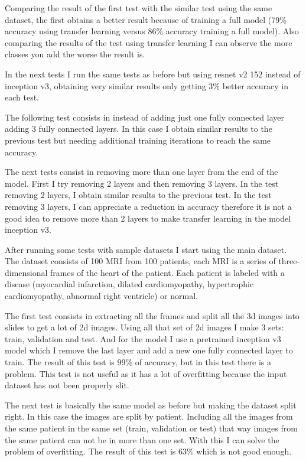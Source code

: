 \documentclass[12pt,a4paper]{article}
\begin{document}
Comparing the result of the first test with the similar test using the same dataset, the first obtains a better result because of training a full model (79\% accuracy using transfer learning versus 86\% accuracy training a full model). Also comparing the results of the test using transfer learning I can observe the more classes you add the worse the result is.
\bigskip

In the next tests I run the same tests as before but using resnet v2 152 instead of inception v3, obtaining very similar results only getting 3\% better accuracy in each test.
\bigskip

The following test consists in instead of adding just one fully connected layer adding 3 fully connected layers. In this case I obtain similar results to the previous test but needing additional training iterations to reach the same accuracy.
\bigskip

The next tests consist in removing more than one layer from the end of the model. First I try removing 2 layers and then removing 3 layers. In the test removing 2 layers, I obtain similar results to the previous test. In the test removing 3 layers, I can appreciate a reduction in accuracy therefore it is not a good idea to remove more than 2 layers to make transfer learning in the model inception v3.
\bigskip

After running some tests with sample datasets I start using the main dataset. The dataset consists of 100 MRI from 100 patients, each MRI is a series of three-dimensional frames of the heart of the patient. Each patient is labeled with a disease (myocardial infarction, dilated cardiomyopathy, hypertrophic cardiomyopathy, abnormal right ventricle) or normal.
\bigskip

The first test consists in extracting all the frames and split all the 3d images into slides to get a lot of 2d images. Using all that set of 2d images I make 3 sets: train, validation and test. And for the model I use a pretrained inception v3 model which I remove the last layer and add a new one fully connected layer to train. The result of this test is 99\% of accuracy, but in this test there is a problem. This test is not useful as it has a lot of overfitting because the input dataset has not been properly slit.
\bigskip

The next test is basically the same model as before but making the dataset split right. In this case the images are split by patient. Including all the images from the same patient in the same set (train, validation or test) that way images from the same patient can not be in more than one set. With this I can solve the problem of overfitting. The result of this test is 63\% which is not good enough.
\bigskip
\end{document}
